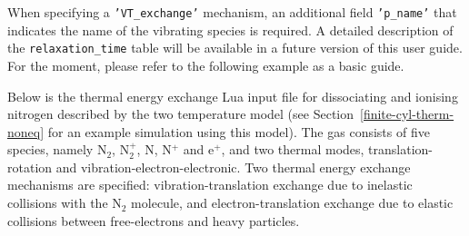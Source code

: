 \par

When specifying a \texttt{'VT\_exchange'} mechanism, an additional field \texttt{'p\_name'}
that indicates the name of the vibrating species is required.
A detailed description of the \texttt{relaxation\_time} table will be available in a 
future version of this user guide.
For the moment, please refer to the following example as a basic guide.

\par

Below is the thermal energy exchange Lua input file for dissociating and ionising nitrogen
described by the two temperature model (see Section~\ref{finite-cyl-therm-noneq} for
an example simulation using this model).
The gas consists of five species, namely N$_2$, N$_2^+$, N, N$^+$ and e$^+$, and two thermal
modes, translation-rotation and vibration-electron-electronic.
Two thermal energy exchange mechanisms are specified: vibration-translation exchange due to
inelastic collisions with the N$_2$ molecule, and electron-translation exchange due to elastic 
collisions between free-electrons and heavy particles.\\
\topbar\\

\bottombar\\
